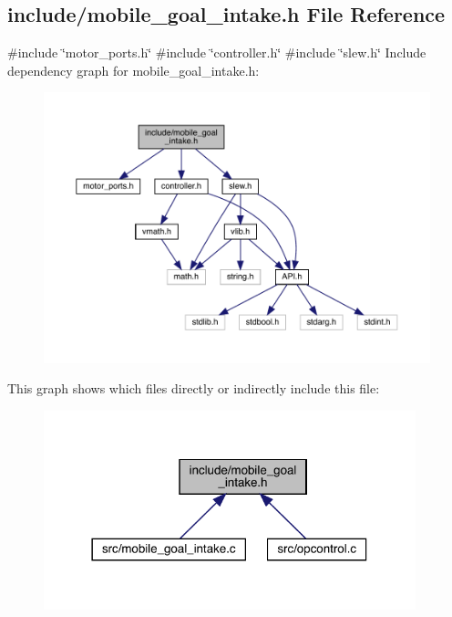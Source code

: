 \subsection{include/mobile\+\_\+goal\+\_\+intake.h File Reference}
\label{mobile__goal__intake_8h}
{\ttfamily \#include \char`\"{}motor\+\_\+ports.\+h\char`\"{}}\newline
{\ttfamily \#include \char`\"{}controller.\+h\char`\"{}}\newline
{\ttfamily \#include \char`\"{}slew.\+h\char`\"{}}\newline
Include dependency graph for mobile\+\_\+goal\+\_\+intake.\+h\+:\nopagebreak
\begin{figure}[H]
\begin{center}
\leavevmode
\includegraphics[width=350pt]{mobile__goal__intake_8h__incl}
\end{center}
\end{figure}
This graph shows which files directly or indirectly include this file\+:\nopagebreak
\begin{figure}[H]
\begin{center}
\leavevmode
\includegraphics[width=306pt]{mobile__goal__intake_8h__dep__incl}
\end{center}
\end{figure}

